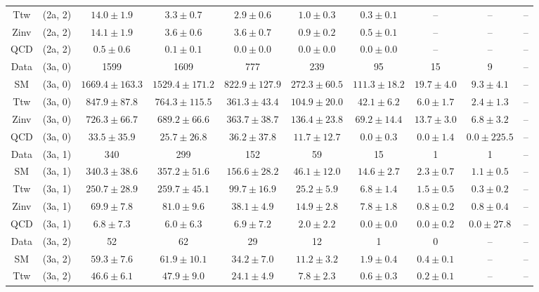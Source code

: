 \begin{table}[h!]
{\begin{tabular}{cccccccccc}
	Ttw & (2a, 2) & $14.0\pm 1.9$ & $3.3\pm 0.7$ & $2.9\pm 0.6$ & $1.0\pm 0.3$ & $0.3\pm 0.1$ & -- & -- & -- \\[0.5ex] 
	Zinv & (2a, 2) & $14.1\pm 1.9$ & $3.6\pm 0.6$ & $3.6\pm 0.7$ & $0.9\pm 0.2$ & $0.5\pm 0.1$ & -- & -- & -- \\[0.5ex] 
	QCD & (2a, 2) & $0.5\pm 0.6$ & $0.1\pm 0.1$ & $0.0\pm 0.0$ & $0.0\pm 0.0$ & $0.0\pm 0.0$ & -- & -- & -- \\[0.5ex] 
	Data & (3a, 0) & 1599 & 1609 & 777 & 239 & 95 & 15 & 9 & -- \\[0.5ex] 
	SM & (3a, 0) & $1669.4\pm 163.3$ & $1529.4\pm 171.2$ & $822.9\pm 127.9$ & $272.3\pm 60.5$ & $111.3\pm 18.2$ & $19.7\pm 4.0$ & $9.3\pm 4.1$ & -- \\[0.5ex] 
	Ttw & (3a, 0) & $847.9\pm 87.8$ & $764.3\pm 115.5$ & $361.3\pm 43.4$ & $104.9\pm 20.0$ & $42.1\pm 6.2$ & $6.0\pm 1.7$ & $2.4\pm 1.3$ & -- \\[0.5ex] 
	Zinv & (3a, 0) & $726.3\pm 66.7$ & $689.2\pm 66.6$ & $363.7\pm 38.7$ & $136.4\pm 23.8$ & $69.2\pm 14.4$ & $13.7\pm 3.0$ & $6.8\pm 3.2$ & -- \\[0.5ex] 
	QCD & (3a, 0) & $33.5\pm 35.9$ & $25.7\pm 26.8$ & $36.2\pm 37.8$ & $11.7\pm 12.7$ & $0.0\pm 0.3$ & $0.0\pm 1.4$ & $0.0\pm 225.5$ & -- \\[0.5ex] 
	Data & (3a, 1) & 340 & 299 & 152 & 59 & 15 & 1 & 1 & -- \\[0.5ex] 
	SM & (3a, 1) & $340.3\pm 38.6$ & $357.2\pm 51.6$ & $156.6\pm 28.2$ & $46.1\pm 12.0$ & $14.6\pm 2.7$ & $2.3\pm 0.7$ & $1.1\pm 0.5$ & -- \\[0.5ex] 
	Ttw & (3a, 1) & $250.7\pm 28.9$ & $259.7\pm 45.1$ & $99.7\pm 16.9$ & $25.2\pm 5.9$ & $6.8\pm 1.4$ & $1.5\pm 0.5$ & $0.3\pm 0.2$ & -- \\[0.5ex] 
	Zinv & (3a, 1) & $69.9\pm 7.8$ & $81.0\pm 9.6$ & $38.1\pm 4.9$ & $14.9\pm 2.8$ & $7.8\pm 1.8$ & $0.8\pm 0.2$ & $0.8\pm 0.4$ & -- \\[0.5ex] 
	QCD & (3a, 1) & $6.8\pm 7.3$ & $6.0\pm 6.3$ & $6.9\pm 7.2$ & $2.0\pm 2.2$ & $0.0\pm 0.0$ & $0.0\pm 0.2$ & $0.0\pm 27.8$ & -- \\[0.5ex] 
	Data & (3a, 2) & 52 & 62 & 29 & 12 & 1 & 0 & -- & -- \\[0.5ex] 
	SM & (3a, 2) & $59.3\pm 7.6$ & $61.9\pm 10.1$ & $34.2\pm 7.0$ & $11.2\pm 3.2$ & $1.9\pm 0.4$ & $0.4\pm 0.1$ & -- & -- \\[0.5ex] 
	Ttw & (3a, 2) & $46.6\pm 6.1$ & $47.9\pm 9.0$ & $24.1\pm 4.9$ & $7.8\pm 2.3$ & $0.6\pm 0.3$ & $0.2\pm 0.1$ & -- & -- \\[0.5ex] 

\end{tabular}}
\end{table}
